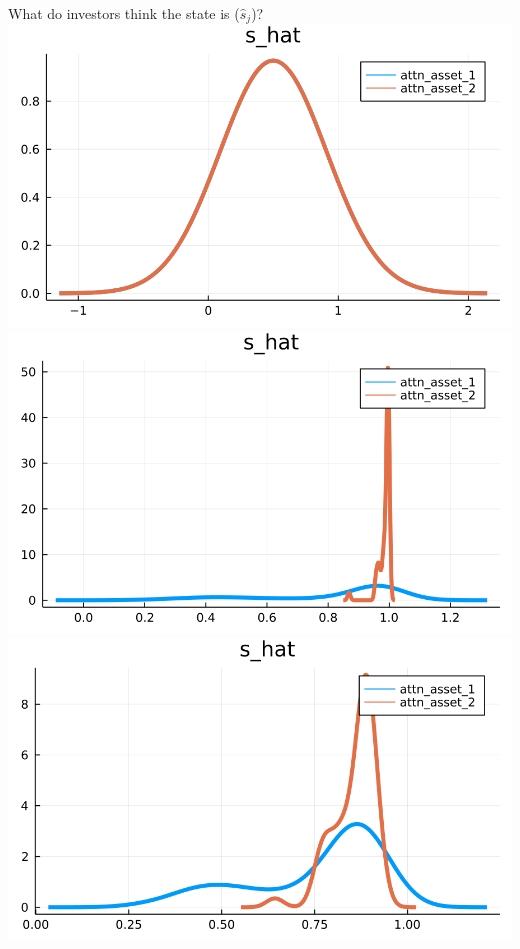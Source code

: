 \documentclass[
  ignorenonframetext,
]{beamer}
\begin{document}
\begin{frame}{What do investors think the state is (\(\hat s_j\))?}
\protect\hypertarget{what-do-investors-think-the-state-is-hat-s_j}{}
\includegraphics[width=0.4\paperheight]{complexity_files/figure-beamer/unnamed-chunk-16-1}
\includegraphics[width=0.4\paperheight]{complexity_files/figure-beamer/unnamed-chunk-16-2}
\includegraphics[width=0.4\paperheight]{complexity_files/figure-beamer/unnamed-chunk-16-3}

\end{frame}
\end{document}
